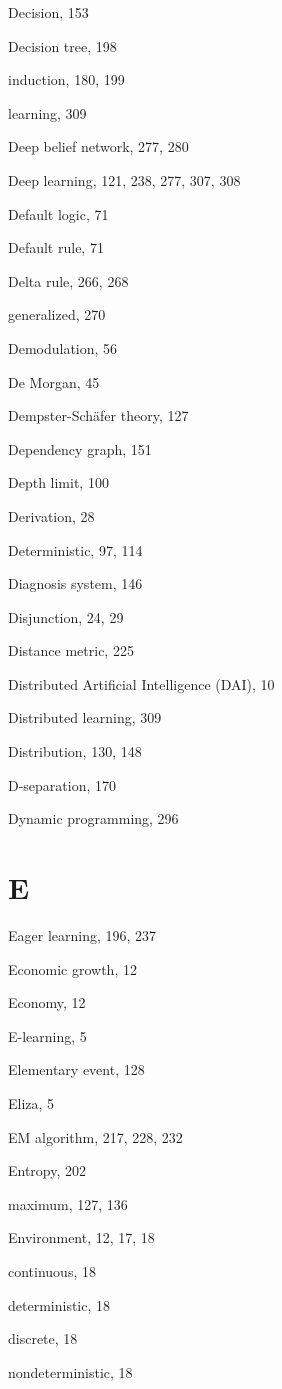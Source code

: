 \documentclass[10pt]{book}
\begin{document}
Decision, 153

Decision tree, 198

induction, 180, 199

learning, 309

Deep belief network, 277, 280

Deep learning, 121, 238, 277, 307, 308

Default logic, 71

Default rule, 71

Delta rule, 266, 268

generalized, 270

Demodulation, 56

De Morgan, 45

Dempster-Sch\"afer theory, 127

Dependency graph, 151

Depth limit, 100

Derivation, 28

Deterministic, 97, 114

Diagnosis system, 146

Disjunction, 24, 29

Distance metric, 225

Distributed Artificial Intelligence (DAI), 10

Distributed learning, 309

Distribution, 130, 148

D-separation, 170

Dynamic programming, 296

\section{E}

Eager learning, 196, 237

Economic growth, 12

Economy, 12

E-learning, 5

Elementary event, 128

Eliza, 5

EM algorithm, 217, 228, 232

Entropy, 202

maximum, 127, 136

Environment, 12, 17, 18

continuous, 18

deterministic, 18

discrete, 18

nondeterministic, 18
\end{document}
